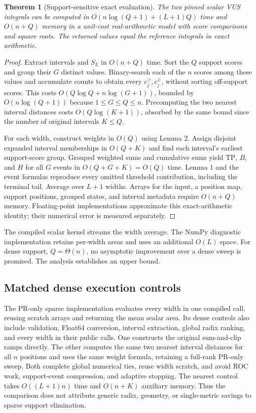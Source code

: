 \documentclass[10pt]{article}
\newtheorem{theorem}{Theorem}
\newcommand{\TP}{\mathrm{TP}}
\begin{document}
\begin{theorem}[Support-sensitive exact evaluation]
The two pinned scalar VUS integrals can be computed in
$O(n\log(Q+1)+(L+1)Q)$ time and $O(n+Q)$ memory in a unit-cost real-arithmetic
model with score comparisons and square roots.
The returned values equal the reference integrals in exact arithmetic.
\end{theorem}
\begin{proof}
Extract intervals and $S_L$ in $O(n+Q)$ time. Sort the $Q$ support scores and
group their $G$ distinct values. Binary-search each of the $n$ scores among
these values and accumulate counts to obtain every $c_j^>,c_j^\ge$, without
sorting off-support scores. This costs $O(Q\log Q+n\log(G+1))$, bounded by
$O(n\log(Q+1))$ because $1\le G\le Q\le n$. Precomputing the two nearest
interval distances costs $O(Q\log(K+1))$, absorbed by the same bound since
the number of original intervals $K\le Q$.

For each width, construct weights in $O(Q)$ using Lemma 2. Assign disjoint
expanded interval memberships in $O(Q+K)$ and find each interval's earliest
support-score group. Grouped weighted sums and cumulative sums yield $\TP$,
$B$, and $H$ for all $G$ events in $O(Q+G+K)=O(Q)$ time. Lemma 1 and the
event formulas reproduce every omitted threshold contribution, including the
terminal tail. Average over $L+1$ widths. Arrays for the input, a position map,
support positions, grouped states, and interval metadata require $O(n+Q)$
memory. Floating-point implementations approximate this exact-arithmetic
identity; their numerical error is measured separately.
\end{proof}
The compiled scalar kernel streams the width average. The NumPy diagnostic
implementation retains per-width areas and uses an additional $O(L)$ space.
For dense support, $Q=\Theta(n)$, no asymptotic improvement over a dense sweep
is promised. The analysis establishes an upper bound.



\subsection{Matched dense execution controls}
The PR-only sparse implementation evaluates every width in one compiled
call, reusing scratch arrays and returning the mean scalar area. Its dense
controls also include validation, Float64 conversion, interval extraction,
global radix ranking, and every width in their public calls. One constructs
the original sum-and-clip ramps directly. The other computes the same two
nearest interval distances for all $n$ positions and uses the same weight
formula, retaining a full-rank PR-only sweep. Both complete global numerical
ties, reuse width scratch, and avoid ROC work, support-event compression,
and adaptive stopping. The nearest control takes $O((L+1)n)$ time and
$O(n+K)$ auxiliary memory. Thus the comparison does not attribute generic
radix, geometry, or single-metric savings to sparse support elimination.
\end{document}

